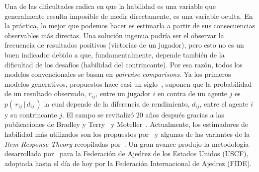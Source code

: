 \documentclass[11pt,twoside,spanish]{report} %
\begin{document}
Una de las dificultades radica en que la habilidad es una variable que generalmente resulta imposible de medir directamente, es una variable oculta.
En la pr\'actica, lo mejor que podemos hacer es estimarla a partir de sus consecuencias observables m\'as directas.
Una soluci\'on ingenua podr\'ia ser el observar la frecuencia de resultados positivos (victorias de un jugador), pero esto no es un buen indicador debido a que, fundamentalmente, depende tambi\'en de la dificultad de los desaf\'ios (habilidad del contrincante).
Por esa raz\'on, todos los modelos convencionales se basan en \emph{pairwise comparisons}.
Ya los primeros modelos generativos, propuestos hace casi un siglo~\cite{thurstone1927-comparativeJugement,Zermelo1929}, suponen que la probabilidad de un resultado observado, $r_{ij}$, entre un jugador $i$ en contra de un agente $j$ es $p(\,r_{ij} \,|\, d_{ij}\,)$ la cual depende de la diferencia de rendimiento, $d_{ij}$, entre el agente $i$ y su contrincante $j$.
El campo se revitaliz\'o $20$ a\~nos despu\'es gracias a las publicaciones de Bradley y Terry~\cite{bradley1952} y Moteller~\cite{mosteller1951a}.
Actualmente, los estimadores de habilidad m\'as utilizados son los propuestos por~\cite{elo1961-uscf,glikman_gliko_2,Herbrich2007} y algunas de las variantes de la \emph{Item-Response Theory} recopiladas por~\cite{vanDerLinden2016,fox2010}.
Un gran avance produjo la metodolog\'ia desarrollada por~\cite{elo1961-uscf} para la Federaci\'on de Ajedrez de los Estados Unidos (USCF), adoptada hasta el d\'ia de hoy por la Federaci\'on Internacional de Ajedrez (FIDE).
\end{document}
